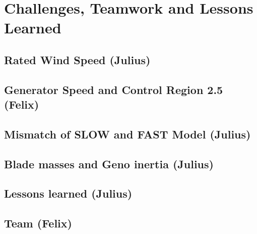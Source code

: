 \chapter{Challenges, Teamwork and Lessons Learned}
\section{Rated Wind Speed (Julius)} \label{RatedWindSpeed}


\section{Generator Speed and Control Region 2.5 (Felix)} \label{Region2d5}


\section{Mismatch of SLOW and FAST Model (Julius)}


\section{Blade masses and Geno inertia (Julius)}

\section{Lessons learned (Julius)}

\section{Team (Felix)}


